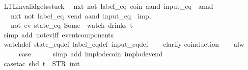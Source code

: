 \begin{isabellebody}
\isanewline
{}\isamarkupfalse%
%
\endisatagproof
{\isafoldproof}%
%
\isadelimproof
\isanewline
%
\endisadelimproof
\isanewline
{}\isamarkupfalse%
\ LTL{\isacharunderscore}invalid{\isacharunderscore}gets{\isacharunderscore}stuck{\isacharunderscore}{}{\isacharcolon}\isanewline
\ \ {\isachardoublequoteopen}{\isacharparenleft}{\isacharparenleft}{\isacharparenleft}nxt\ {\isacharparenleft}not\ {\isacharparenleft}label_eq\ {\isacharprime}{\isacharprime}coin{\isacharprime}{\isacharprime}\ aand\ input_eq\ {\isacharbrackleft}{\isacharbrackright}{\isacharparenright}{\isacharparenright}{\isacharparenright}\ aand\isanewline
\ \ \ {\isacharparenleft}nxt\ {\isacharparenleft}not\ {\isacharparenleft}label_eq\ {\isacharprime}{\isacharprime}vend{\isacharprime}{\isacharprime}\ aand\ input_eq\ {\isacharbrackleft}{\isacharbrackright}{\isacharparenright}{\isacharparenright}{\isacharparenright}{\isacharparenright}\ impl\isanewline
\ \ \ {\isacharparenleft}not\ {\isacharparenleft}ev\ {\isacharparenleft}state_eq\ {\isacharparenleft}Some\ {}{\isacharparenright}{\isacharparenright}{\isacharparenright}{\isacharparenright}{\isacharparenright}\ {\isacharparenleft}watch\ drinks\ t{\isacharparenright}{\isachardoublequoteclose}\isanewline
%
\isadelimproof
\ \ %
\endisadelimproof
%
\isatagproof
{}\isamarkupfalse%
\ {\isacharparenleft}simp\ add{\isacharcolon}\ not{\isacharunderscore}ev{\isacharunderscore}iff\ event{\isacharunderscore}components{\isacharparenright}\isanewline
\ \ \isamarkupfalse%
\ watch{\isacharunderscore}def\ state_eq{\isacharunderscore}def\ label_eq{\isacharunderscore}def\ input_eq{\isacharunderscore}def\isanewline
\ \ \isamarkupfalse%
\ clarify\isanewline
{}\isamarkupfalse%
{\isacharparenleft}coinduction{\isacharparenright}\isanewline
\ \ \isamarkupfalse%
\ alw\isanewline
\ \ \isamarkupfalse%
\ \isamarkupfalse%
\ {\isacharquery}case\isanewline
\ \ \ \ \isamarkupfalse%
\ {\isacharparenleft}simp\ add{\isacharcolon}\ implode{\isacharunderscore}coin\ implode{\isacharunderscore}vend{\isacharparenright}\isanewline
\ \ \ \ \isamarkupfalse%
\ {\isacharparenleft}case{\isacharunderscore}tac\ {\isachardoublequoteopen}shd\ t\ {\isacharequal}\ {\isacharparenleft}STR\ {\isacharprime}{\isacharprime}init{\isacharprime}{\isacharprime}{\isacharcomma}\ {\isacharbrackleft}{\isacharbrackright}{\isacharparenright}{\isachardoublequoteclose}{\isacharparenright}\isanewline
\ \ \ \ \ \isamarkupfalse%

\end{isabellebody}
